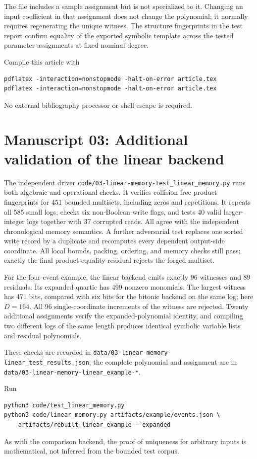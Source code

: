 \documentclass[11pt,a4paper]{article}
\theoremstyle{definition}
\theoremstyle{remark}
\newcommand{\repo}[1]{\nolinkurl{#1}}
\begin{document}
The file includes a sample assignment but is not specialized to it.
Changing an input coefficient in that assignment does not change the
polynomial; it normally requires regenerating the unique witness. The
structure fingerprints in the test report confirm equality of the
exported symbolic template across the tested parameter assignments at
fixed nominal degree.

Compile this article with
\begin{lstlisting}
pdflatex -interaction=nonstopmode -halt-on-error article.tex
pdflatex -interaction=nonstopmode -halt-on-error article.tex
\end{lstlisting}
No external bibliography processor or shell escape is required.


\section{Manuscript 03: Additional validation of the linear backend}\label{cdc:mem:app:linear-tests}
The independent driver \repo{code/03-linear-memory-test_linear_memory.py} runs both algebraic
and operational checks. It verifies collision-free product fingerprints for
451 bounded multisets, including zeros and repetitions. It repeats all 585
small logs, checks six non-Boolean write flags, and tests 40 valid larger-integer
logs together with 37 corrupted reads. All agree with the independent
chronological memory semantics. A further adversarial test replaces one sorted
write record by a duplicate and recomputes every dependent output-side
coordinate. All local bounds, packing, ordering, and memory checks still pass;
exactly the final product-equality residual rejects the forged multiset.

For the four-event example, the linear backend emits exactly 96 witnesses and
89 residuals. Its expanded quartic has 499 nonzero monomials. The largest
witness has 471 bits, compared with six bits for the bitonic backend on the
same log; here $D=164$. All 96 single-coordinate increments of the witness are
rejected. Twenty additional assignments verify the expanded-polynomial
identity, and compiling two different logs of the same length produces
identical symbolic variable lists and residual polynomials.

These checks are recorded in \repo{data/03-linear-memory-linear_test_results.json}; the
complete polynomial and assignment are in \repo{data/03-linear-memory-linear_example-*}.
\par\medskip
\noindent\begin{minipage}{\textwidth}
Run
\begin{lstlisting}
python3 code/test_linear_memory.py
python3 code/linear_memory.py artifacts/example/events.json \
    artifacts/rebuilt_linear_example --expanded
\end{lstlisting}
As with the comparison backend, the proof of uniqueness for arbitrary inputs
is mathematical, not inferred from the bounded test corpus.
\end{minipage}\par
\end{document}
